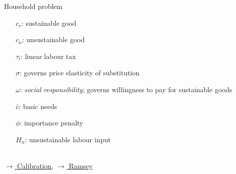 \documentclass[11pt,aspectratio=169]{beamer}
\begin{document}
\begin{frame}{Household problem}
		\small
		\begin{minipage}[t!]{0.32\textwidth}
			\vspace{7mm}
			\begin{itemize}
				\item[] $c_s$: sustainable good \vspace{-2mm}
				\item[] $c_n$: unsustainable good\vspace{-2mm}
				\item[] $\tau_l$: linear labour tax
				\item[]
				\item[]
			\end{itemize}
		\end{minipage}
		\begin{minipage}[t!]{0.35\textwidth}
			\vspace{8mm}
			\begin{itemize}
				\item[$\sigma$:]  governs price elasticity of substitution%
				\vspace{-2mm}
				\item[$\omega$:] \textit{social responsibility}; governs willingness to pay for sustainable goods %
				\item[]	
			\end{itemize}
		\end{minipage}
		\begin{minipage}[t!]{0.3\textwidth}
			\vspace{9mm}
			\begin{itemize}	
				\item[] $\bar{c}$: basic needs
				\vspace{-2mm}
				\item[] $\phi$: importance penalty
				\vspace{-2mm}	
				\item[] $H_n$: unsustainable labour input	
				\item[]
				\item[]
			\end{itemize}
		\end{minipage}
	\\ 
	\vspace{-8mm}
	\hfill
		\hyperlink{red}{\tiny{$\rightarrow$ Calibration,}}		\hyperlink{backpa}{\tiny{$\rightarrow$ Ramsey}}
	\hypertarget{backmodel}{}
	\end{frame}
%	
\end{document}
